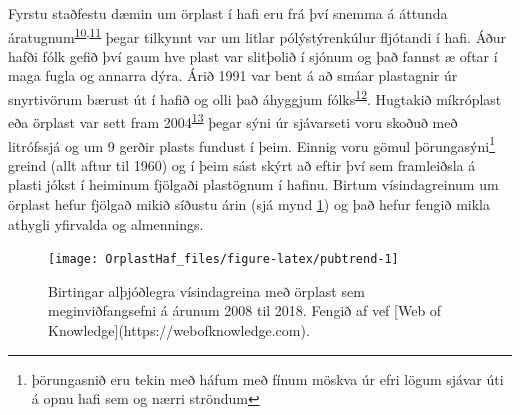 \documentclass[icelandic,]{book}
\let\rmarkdownfootnote\footnote%
\def\footnote{\protect\rmarkdownfootnote}
\begin{document}
Fyrstu staðfestu dæmin um örplast í hafi eru frá því snemma á áttunda áratugnum\textsuperscript{\protect\hyperlink{ref-Waters1972}{10},\protect\hyperlink{ref-Colton1974}{11}} þegar tilkynnt var um litlar pólýstýrenkúlur fljótandi í hafi. Áður hafði fólk gefið því gaum hve plast var slitþolið í sjónum og það fannst æ oftar í maga fugla og annarra dýra. Árið 1991 var bent á að smáar plastagnir úr snyrtivörum bærust út í hafið og olli það áhyggjum fólks\textsuperscript{\protect\hyperlink{ref-zitko1991another}{12}}. Hugtakið míkróplast eða örplast var sett fram 2004\textsuperscript{\protect\hyperlink{ref-Thompson2004lost}{13}} þegar sýni úr sjávarseti voru skoðuð með litrófssjá og um 9 gerðir plasts fundust í þeim. Einnig voru gömul þörungasýni\footnote{þörungasnið eru tekin með háfum með fínum möskva úr efri lögum sjávar úti á opnu hafi sem og nærri ströndum} greind (allt aftur til 1960) og í þeim sást skýrt að eftir því sem framleiðsla á plasti jókst í heiminum fjölgaði plastögnum í hafinu. Birtum vísindagreinum um örplast hefur fjölgað mikið síðustu árin (sjá mynd \ref{fig:pubtrend}) og það hefur fengið mikla athygli yfirvalda og almennings.

\begin{figure}

{\centering \texttt{[image: OrplastHaf\_files/figure-latex/pubtrend-1]} 

}

\caption{Birtingar alþjóðlegra vísindagreina með örplast sem meginviðfangsefni á árunum 2008 til 2018. Fengið af vef [Web of Knowledge](https://webofknowledge.com).}\label{fig:pubtrend}
\end{figure}
\end{document}
